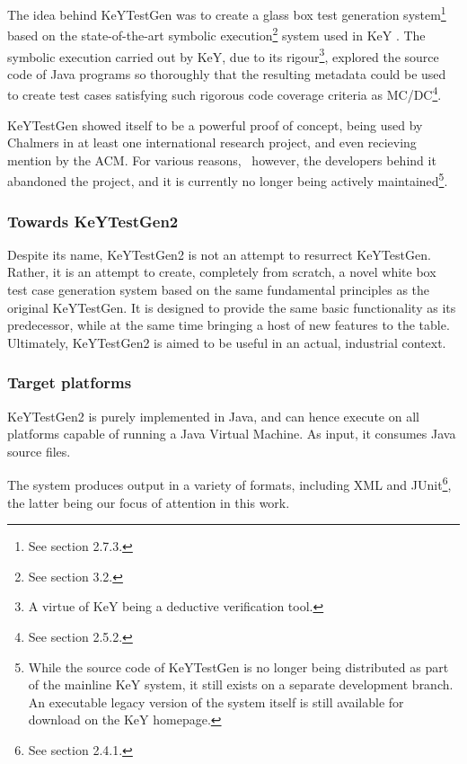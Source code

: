 \documentclass{article}
\begin{document}
The idea behind KeYTestGen was to create a glass box test generation
system{\footnote{See section 2.7.3.}} based on the state-of-the-art symbolic
execution{\footnote{See section 3.2.}} system used in KeY
{\cite{EngelHaehnle07}}. The symbolic execution carried out by KeY, due to its
rigour{\footnote{A virtue of KeY being a deductive verification tool.}},
explored the source code of Java programs so thoroughly that the resulting
metadata could be used to create test cases satisfying such rigorous code
coverage criteria as MC/DC{\footnote{See section 2.5.2.}}.



KeYTestGen showed itself to be a powerful proof of concept, being used by
Chalmers in at least one international research project, and even recieving
mention by the ACM. For various reasons, \ however, the developers behind it
abandoned the project, and it is currently no longer being actively
maintained{\footnote{While the source code of KeYTestGen is no longer being
distributed as part of the mainline KeY system, it still exists on a separate
development branch. An executable legacy version of the system itself is still
available for download on the KeY homepage.}}.



\subsubsection{Towards KeYTestGen2}

Despite its name, KeYTestGen2 is not an attempt to resurrect KeYTestGen.
Rather, it is an attempt to create, completely from scratch, a novel white box
test case generation system based on the same fundamental principles as the
original KeYTestGen. It is designed to provide the same basic functionality as
its predecessor, while at the same time bringing a host of new features to the
table. Ultimately, KeYTestGen2 is aimed to be useful in an actual, industrial
context.



\subsubsection{Target platforms}

KeYTestGen2 is purely implemented in Java, and can hence execute on all
platforms capable of running a Java Virtual Machine. As input, it consumes
Java source files.



The system produces output in a variety of formats, including XML and
JUnit{\footnote{See section 2.4.1.}}, the latter being our focus of attention
in this work.
\end{document}
